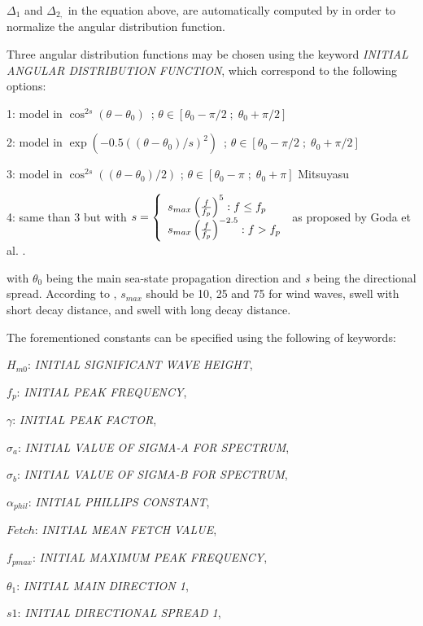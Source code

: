 $\Delta_{1}$ and $\Delta_{2,}$ in the equation above, are automatically computed by \tomawac in order to normalize the angular
distribution function.

Three angular distribution functions may be chosen using the keyword \textit{INITIAL ANGULAR DISTRIBUTION FUNCTION}, which
correspond to the following options:

 1: model in $\cos ^{2s} (\theta -\theta _{0} )$~; $\theta \in \left[\theta _{0} -\pi /2\; ;\; \theta _{0} +\pi /2\right]$

 2: model in $\exp \left(-0.5\left(\left(\theta -\theta _{0} \right)/s\right)^{2} \right)$~; $\theta \in \left[\theta _{0} -
   \pi /2\; ;\; \theta _{0} +\pi /2\right]$

 3: model in $\cos ^{2s} \left(\left(\theta -\theta _{0} \right)/2\right)$ ; $\theta \in \left[\theta _{0} -\pi \; ;\; \theta _{0}
   +\pi \right]$ Mitsuyasu \cite{Mitsuyasu1975}

 4: same than 3 but with
 $ s=\left\{ \barr{l} s_{max} \left(\frac{f}{f_p} \right)^5 : f\le f_p \\
 s_{max} \left(\frac{f}{f_p} \right)^{-2.5} : f > f_p \earr\right. $ as proposed by Goda et al. \cite{Goda1975}. 
 
 with $\theta_{0}$ being the main sea-state propagation direction and \textit{s} being the directional spread. According to
 \cite{Goda1975}, $s_{max}$ should be 10, 25 and 75 for wind waves, swell with short decay distance, and swell with long decay
 distance.

 The forementioned constants can be specified using the following of keywords:

 $H_{m0}$: \textit{INITIAL SIGNIFICANT WAVE HEIGHT},

 $f_p$:  \textit{INITIAL PEAK FREQUENCY},

 $\gamma$:  \textit{INITIAL PEAK FACTOR},

 $\sigma_a$:  \textit{INITIAL VALUE OF SIGMA-A FOR SPECTRUM},

 $\sigma_b$:  \textit{INITIAL VALUE OF SIGMA-B FOR SPECTRUM},

 $\alpha_{phil}$:  \textit{INITIAL PHILLIPS CONSTANT},

 $Fetch$:  \textit{INITIAL MEAN FETCH VALUE},

 $f_{pmax}$:  \textit{INITIAL MAXIMUM PEAK FREQUENCY},

 $\theta_1$:  \textit{INITIAL MAIN DIRECTION 1},

 $s1$:  \textit{INITIAL DIRECTIONAL SPREAD 1},

